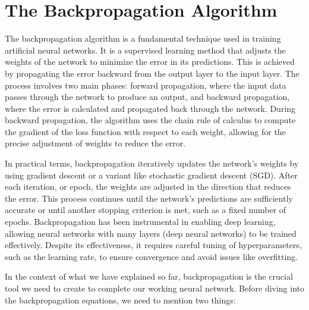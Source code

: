 \documentclass[../main]{subfiles}
\begin{document}
\chapter{The Backpropagation Algorithm}

{
\hypersetup{linkcolor=black}
\minitoc
\vspace{5mm}
}
The backpropagation algorithm is a fundamental technique used in training artificial neural networks. It is a supervised learning method that adjusts the weights of the network to minimize the error in its predictions. This is achieved by propagating the error backward from the output layer to the input layer. The process involves two main phases: forward propagation, where the input data passes through the network to produce an output, and backward propagation, where the error is calculated and propagated back through the network. During backward propagation, the algorithm uses the chain rule of calculus to compute the gradient of the loss function with respect to each weight, allowing for the precise adjustment of weights to reduce the error.

In practical terms, backpropagation iteratively updates the network's weights by using gradient descent or a variant like stochastic gradient descent (SGD). After each iteration, or epoch, the weights are adjusted in the direction that reduces the error. This process continues until the network's predictions are sufficiently accurate or until another stopping criterion is met, such as a fixed number of epochs. Backpropagation has been instrumental in enabling deep learning, allowing neural networks with many layers (deep neural networks) to be trained effectively. Despite its effectiveness, it requires careful tuning of hyperparameters, such as the learning rate, to ensure convergence and avoid issues like overfitting.

In the context of what we have explained so far, backpropagation is the crucial tool we need to create to complete our working neural network. Before diving into the backpropagation equations, we need to mention two things:
\end{document}
